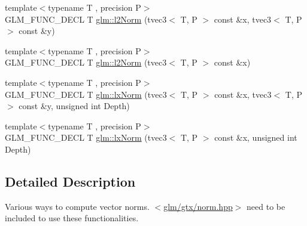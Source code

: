 \begin{DoxyCompactItemize}
\item 
{\footnotesize template$<$typename T , precision P$>$ }\\G\-L\-M\-\_\-\-F\-U\-N\-C\-\_\-\-D\-E\-C\-L T \hyperlink{group__gtx__norm_gafa6fbbc99cd44d81bf030e74eaf7ad64}{glm\-::l2\-Norm} (tvec3$<$ T, P $>$ const \&x, tvec3$<$ T, P $>$ const \&y)
\item 
{\footnotesize template$<$typename T , precision P$>$ }\\G\-L\-M\-\_\-\-F\-U\-N\-C\-\_\-\-D\-E\-C\-L T \hyperlink{group__gtx__norm_ga0a8cb8a0ce88d1d977de23209bf04610}{glm\-::l2\-Norm} (tvec3$<$ T, P $>$ const \&x)
\item 
{\footnotesize template$<$typename T , precision P$>$ }\\G\-L\-M\-\_\-\-F\-U\-N\-C\-\_\-\-D\-E\-C\-L T \hyperlink{group__gtx__norm_ga932bb0854e5c5a6ab5a14b023c451ca7}{glm\-::lx\-Norm} (tvec3$<$ T, P $>$ const \&x, tvec3$<$ T, P $>$ const \&y, unsigned int Depth)
\item 
{\footnotesize template$<$typename T , precision P$>$ }\\G\-L\-M\-\_\-\-F\-U\-N\-C\-\_\-\-D\-E\-C\-L T \hyperlink{group__gtx__norm_gaab931b0d1acfe2f9c1cb78311edf24fc}{glm\-::lx\-Norm} (tvec3$<$ T, P $>$ const \&x, unsigned int Depth)
\end{DoxyCompactItemize}


\subsection{Detailed Description}
Various ways to compute vector norms. $<$\hyperlink{norm_8hpp}{glm/gtx/norm.\-hpp}$>$ need to be included to use these functionalities. 

